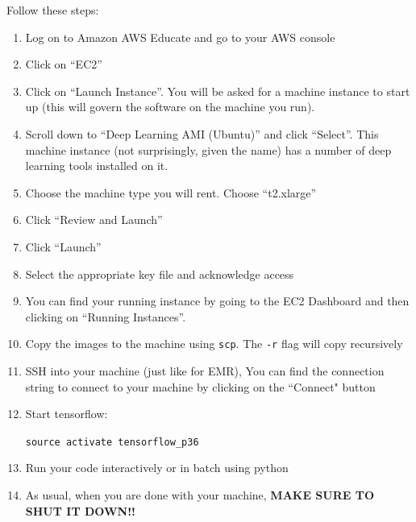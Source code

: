 \documentclass[11pt]{article}
\renewcommand\:{\colon} %
\begin{document}
Follow these steps:
\begin{enumerate}
\item  Log on to Amazon AWS Educate and go to your AWS console
\item Click on ``EC2''
\item Click on ``Launch Instance''. You will be asked for a machine instance to start up (this will govern the software on the machine you run).
\item Scroll down to ``Deep Learning AMI (Ubuntu)'' and click ``Select''. This machine instance (not
surprisingly, given the name) has a number of deep learning tools installed on it. 
\item Choose the machine type you will rent. Choose ``t2.xlarge''  
\item Click ``Review and Launch''
\item Click ``Launch''
\item Select the appropriate key file and acknowledge access
\item You can find your running instance by going to the EC2 Dashboard and then clicking on ``Running Instances''.

\item Copy the images to the machine using \texttt{scp}. The \texttt{-r} flag will copy recursively


\item SSH into your machine (just like for EMR), You can find the connection string to connect to your machine by clicking on the ``Connect" button

\item Start tensorflow:

\texttt{source activate tensorflow\_p36}\\

\item Run your code interactively or in batch using python

\item As usual, when you are done with your machine, \textbf{MAKE SURE TO SHUT IT DOWN!!}
\end{enumerate}
\end{document}
